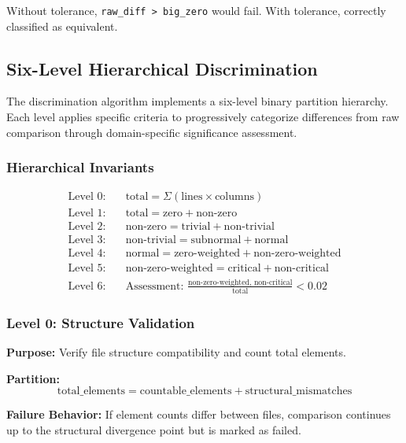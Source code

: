 \documentclass[11pt,letterpaper]{article}
\begin{document}
Without tolerance, \texttt{raw\_diff > big\_zero} would fail. With tolerance, correctly classified as equivalent.

\subsection{Six-Level Hierarchical Discrimination}

The discrimination algorithm implements a six-level binary partition hierarchy. Each level applies specific criteria to progressively categorize differences from raw comparison through domain-specific significance assessment.

\subsubsection{Hierarchical Invariants}

\begin{align*}
    \text{Level 0:} \quad & \text{total} = \Sigma(\text{lines} \times \text{columns}) \\
    \text{Level 1:} \quad & \text{total} = \text{zero} + \text{non-zero} \\
    \text{Level 2:} \quad & \text{non-zero} = \text{trivial} + \text{non-trivial} \\
    \text{Level 3:} \quad & \text{non-trivial} = \text{subnormal} + \text{normal} \\
    \text{Level 4:} \quad & \text{normal} = \text{zero-weighted} + \text{non-zero-weighted} \\
    \text{Level 5:} \quad & \text{non-zero-weighted} = \text{critical} + \text{non-critical} \\
    \text{Level 6:} \quad & \text{Assessment: } \frac{\text{non-zero-weighted, non-critical}}{\text{total}} < 0.02
\end{align*}

\subsubsection{Level 0: Structure Validation}

\textbf{Purpose:} Verify file structure compatibility and count total elements.

\textbf{Partition:}
\begin{equation}
    \text{total\_elements} = \text{countable\_elements} + \text{structural\_mismatches}
\end{equation}

\textbf{Failure Behavior:} If element counts differ between files, comparison continues up to the structural divergence point but is marked as failed.
\end{document}
